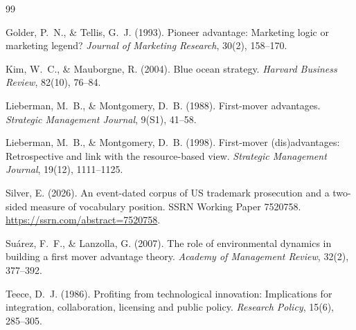 \begin{thebibliography}{99}

Golder, P.~N., \& Tellis, G.~J. (1993). Pioneer advantage: Marketing logic or
marketing legend? \emph{Journal of Marketing Research}, 30(2), 158--170.

Kim, W.~C., \& Mauborgne, R. (2004). Blue ocean strategy. \emph{Harvard
Business Review}, 82(10), 76--84.

Lieberman, M.~B., \& Montgomery, D.~B. (1988). First-mover advantages.
\emph{Strategic Management Journal}, 9(S1), 41--58.

Lieberman, M.~B., \& Montgomery, D.~B. (1998). First-mover (dis)advantages:
Retrospective and link with the resource-based view. \emph{Strategic
Management Journal}, 19(12), 1111--1125.

Silver, E. (2026). An event-dated corpus of US trademark prosecution and
a two-sided measure of vocabulary position. SSRN Working Paper 7520758.
\url{https://ssrn.com/abstract=7520758}.

Su\'arez, F.~F., \& Lanzolla, G. (2007). The role of environmental
dynamics in building a first mover advantage theory. \emph{Academy of
Management Review}, 32(2), 377--392.

Teece, D.~J. (1986). Profiting from technological innovation:
Implications for integration, collaboration, licensing and public
policy. \emph{Research Policy}, 15(6), 285--305.

\end{thebibliography}
